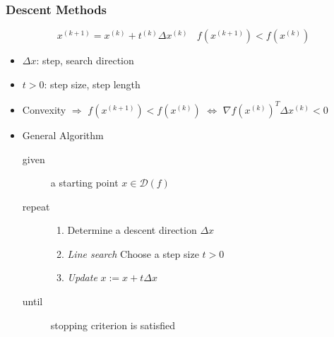\subsubsection*{Descent Methods}
\begin{equation}
    x^{(k+1)}=x^{(k)}+t^{(k)}\Delta x^{(k)}~~~~f(x^{(k+1)})<f(x^{(k)})
\end{equation}
\begin{itemize}
    \item $\Delta x$: step, search direction
    \item $t>0$: step size, step length
    \item Convexity $\Rightarrow$ $f(x^{(k+1)})<f(x^{(k)})$ $\Leftrightarrow$ $\nabla f(x^{(k)})^T\Delta x^{(k)}<0$
    \item General Algorithm
    \begin{description}
        \item[given] a starting point $x\in\mathcal{D}(f)$
        \item[repeat] \phantom{}
        \begin{enumerate}
            \item Determine a descent direction $\Delta x$
            \item \textit{Line search} Choose a step size $t>0$
            \item \textit{Update} $x:=x+t\Delta x$
        \end{enumerate}
        \item[until] stopping criterion is satisfied
    \end{description}
\end{itemize}

